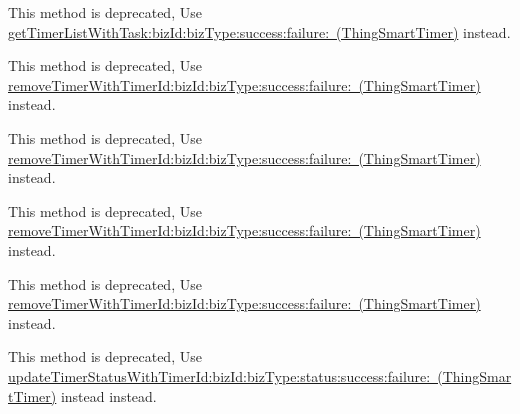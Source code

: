 \begin{DoxyRefList}
\label{deprecated__deprecated000112}%
%
This method is deprecated, Use \mbox{\hyperlink{interface_thing_smart_timer_a636ed7dbd11f77e442c6ab8b75b1f660}{get\+Timer\+List\+With\+Task\+:biz\+Id\+:biz\+Type\+:success\+:failure\+: (\+Thing\+Smart\+Timer)}} instead.  
\item[(Thing\+Deprecated\+Api) Member \mbox{\hyperlink{category_thing_smart_timer_07_thing_deprecated_api_08_a2aaf7227ba5a25155d7c514b6da1341c}{\mbox{[}Thing\+Smart\+Timer(Thing\+Deprecated\+Api) remove\+Timer\+With\+Task\+:dev\+Id\+:timer\+Id\+:success\+:failure\+:\mbox{]}}} ]\label{deprecated__deprecated000109}%
%
This method is deprecated, Use \mbox{\hyperlink{interface_thing_smart_timer_acd2dcb056764efcfcf05382a707e1c1b}{remove\+Timer\+With\+Timer\+Id\+:biz\+Id\+:biz\+Type\+:success\+:failure\+: (\+Thing\+Smart\+Timer)}} instead. 

\label{deprecated__deprecated000127}%
%
This method is deprecated, Use \mbox{\hyperlink{interface_thing_smart_timer_acd2dcb056764efcfcf05382a707e1c1b}{remove\+Timer\+With\+Timer\+Id\+:biz\+Id\+:biz\+Type\+:success\+:failure\+: (\+Thing\+Smart\+Timer)}} instead. 

\label{deprecated__deprecated000100}%
%
This method is deprecated, Use \mbox{\hyperlink{interface_thing_smart_timer_acd2dcb056764efcfcf05382a707e1c1b}{remove\+Timer\+With\+Timer\+Id\+:biz\+Id\+:biz\+Type\+:success\+:failure\+: (\+Thing\+Smart\+Timer)}} instead. 

\label{deprecated__deprecated000118}%
%
This method is deprecated, Use \mbox{\hyperlink{interface_thing_smart_timer_acd2dcb056764efcfcf05382a707e1c1b}{remove\+Timer\+With\+Timer\+Id\+:biz\+Id\+:biz\+Type\+:success\+:failure\+: (\+Thing\+Smart\+Timer)}} instead.  
\item[(Thing\+Deprecated\+Api) Member \mbox{\hyperlink{category_thing_smart_timer_07_thing_deprecated_api_08_a082877c8f68df38e2d8d8f4153007c79}{\mbox{[}Thing\+Smart\+Timer(Thing\+Deprecated\+Api) update\+Timer\+Status\+With\+Task\+:dev\+Id\+:timer\+Id\+:status\+:success\+:failure\+:\mbox{]}}} ]\label{deprecated__deprecated000117}%
%
This method is deprecated, Use \mbox{\hyperlink{interface_thing_smart_timer_a0bfd1b2d301c2f6086608156df297d3f}{update\+Timer\+Status\+With\+Timer\+Id\+:biz\+Id\+:biz\+Type\+:status\+:success\+:failure\+: (\+Thing\+Smart\+Timer)}} instead instead. 


\end{DoxyRefList}
